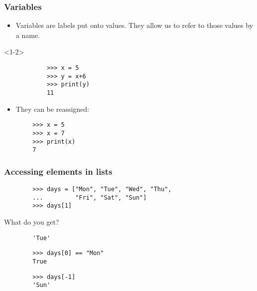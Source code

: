 \documentclass[notes]{beamer}
\begin{document}
	\begin{frame}[fragile]
		\frametitle{Variables}
		\begin{itemize}
			\item Variables are labels put onto values. They allow us to refer to those values by a name.
		\end{itemize}
		
		\begin{onlyenv}
			\begin{lstlisting}
			>>> x = 5
			>>> y = x+6
			>>> print(y)
			11
			\end{lstlisting}
		\end{onlyenv}
		
		\pause
		
		\begin{itemize}
			\item They can be reassigned:
		\end{itemize}
		
		\begin{lstlisting}
		>>> x = 5
		>>> x = 7
		>>> print(x)
		7
		\end{lstlisting}
		
		
	\end{frame}
	
	\begin{frame}[fragile]
		\frametitle{Accessing elements in lists}
		
		\begin{lstlisting}
		>>> days = ["Mon", "Tue", "Wed", "Thu",
		...         "Fri", "Sat", "Sun"]
		>>> days[1]
		\end{lstlisting}
		\pause
		What do you get?
		\\
		\pause
		\begin{lstlisting}
		'Tue'
		\end{lstlisting}
		\pause
		\begin{lstlisting}
		>>> days[0] == "Mon"
		True
		\end{lstlisting}
		\pause
		\begin{lstlisting}
		>>> days[-1]
		'Sun'
		\end{lstlisting}
	\end{frame}
	
\end{document}
